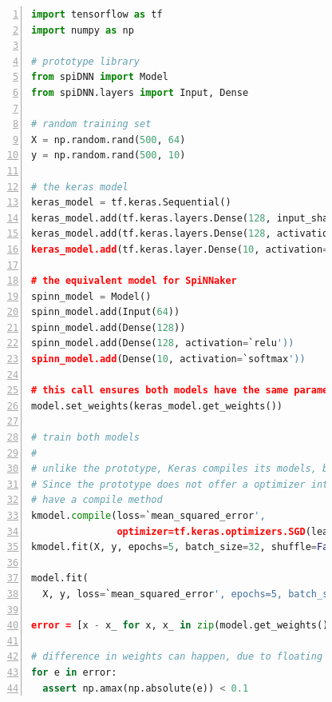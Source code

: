 \documentclass[]{article}
\begin{document}
\begin{figure} %
\begin{lstlisting}[language=Python, caption={Example code comparing
  training with Keras to training with the prototype. The code would
  result in a model (not the machine graph) akin to the one shown in
  Figure~\ref{fig:spiDNN_arch}.}, captionpos=b,
  label=lst:backprop, numbers=left]
import tensorflow as tf
import numpy as np

# prototype library
from spiDNN import Model
from spiDNN.layers import Input, Dense

# random training set
X = np.random.rand(500, 64)
y = np.random.rand(500, 10)

# the keras model
keras_model = tf.keras.Sequential()
keras_model.add(tf.keras.layers.Dense(128, input_shape=(64,)))
keras_model.add(tf.keras.layers.Dense(128, activation=`relu'))
keras_model.add(tf.keras.layer.Dense(10, activation=`softmax'))

# the equivalent model for SpiNNaker
spinn_model = Model()
spinn_model.add(Input(64))
spinn_model.add(Dense(128))
spinn_model.add(Dense(128, activation=`relu'))
spinn_model.add(Dense(10, activation=`softmax'))

# this call ensures both models have the same parameters
model.set_weights(keras_model.get_weights())

# train both models
#
# unlike the prototype, Keras compiles its models, before they can be trained.
# Since the prototype does not offer a optimizer interface yet, it does not
# have a compile method
kmodel.compile(loss=`mean_squared_error',
               optimizer=tf.keras.optimizers.SGD(learning_rate=0.01))
kmodel.fit(X, y, epochs=5, batch_size=32, shuffle=False)

model.fit(
  X, y, loss=`mean_squared_error', epochs=5, batch_size=32, learning_rate=0.01)

error = [x - x_ for x, x_ in zip(model.get_weights(), kmodel.get_weights())]

# difference in weights can happen, due to floating point errors
for e in error:
  assert np.amax(np.absolute(e)) < 0.1
\end{lstlisting}
\end{figure} %
\end{document}
